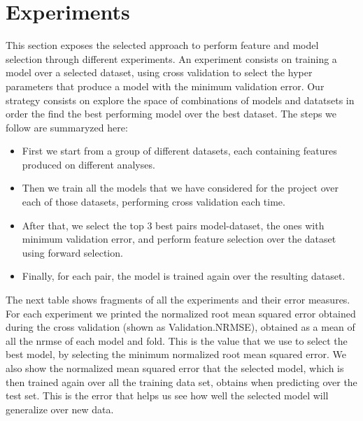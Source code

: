 \section{Experiments}

This section exposes the selected approach to perform feature and model selection through different experiments. An experiment consists on training a model over a selected dataset, using cross validation to select the hyper parameters that produce a model with the minimum validation error. Our strategy consists on explore the space of combinations of models and datatsets in order the find the best performing model over the best dataset. The steps we follow are summaryzed here:
\begin{itemize}
    \item First we start from a group of different datasets, each containing features produced on different analyses. 
    \item Then we train all the models that we have considered for the project over each of those datasets, performing cross validation each time.
    \item After that, we select the top 3 best pairs model-dataset, the ones with minimum validation error, and perform feature selection over the dataset using forward selection. 
    \item Finally, for each pair, the model is trained again over the resulting dataset.\\
\end{itemize}

The next table shows fragments of all the experiments and their error measures. For each experiment we printed the normalized root mean squared error obtained during the cross validation (shown as Validation.NRMSE), obtained as a mean of all the nrmse of each model and fold. This is the value that we use to select the best model, by selecting the minimum normalized root mean squared error. We also show the normalized mean squared error that the selected model, which is then trained again over all the training data set, obtains when predicting over the test set. This is the error that helps us see how well the selected model will generalize over new data.


